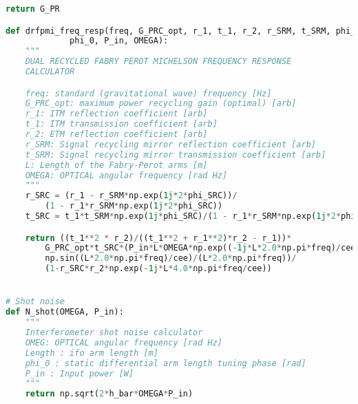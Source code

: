 \begin{lstlisting}[frame=single, language=Python]
    return G_PR

def drfpmi_freq_resp(freq, G_PRC_opt, r_1, t_1, r_2, r_SRM, t_SRM, phi_SRC, L, 
		     phi_0, P_in, OMEGA):
    """
    DUAL RECYCLED FABRY PEROT MICHELSON FREQUENCY RESPONSE 
    CALCULATOR

    freq: standard (gravitational wave) frequency [Hz]
    G_PRC_opt: maximum power recycling gain (optimal) [arb]
    r_1: ITM reflection coefficient [arb]
    t_1: ITM transmission coefficient [arb]
    r_2: ETM reflection coefficient [arb]
    r_SRM: Signal recycling mirror reflection coefficient [arb]
    t_SRM: Signal recycling mirror transmission coefficient [arb]
    L: Length of the Fabry-Perot arms [m]
    OMEGA: OPTICAL angular frequency [rad Hz]
    """
    r_SRC = (r_1 - r_SRM*np.exp(1j*2*phi_SRC))/
	    (1 - r_1*r_SRM*np.exp(1j*2*phi_SRC))
    t_SRC = t_1*t_SRM*np.exp(1j*phi_SRC)/(1 - r_1*r_SRM*np.exp(1j*2*phi_SRC))

    return ((t_1**2 * r_2)/((t_1**2 + r_1**2)*r_2 - r_1))*
	    G_PRC_opt*t_SRC*(P_in*L*OMEGA*np.exp((-1j*L*2.0*np.pi*freq)/cee)*
	    np.sin((L*2.0*np.pi*freq)/cee)/(L*2.0*np.pi*freq))/
	    (1-r_SRC*r_2*np.exp(-1j*L*4.0*np.pi*freq/cee))


# Shot noise
def N_shot(OMEGA, P_in):
    """
    Interferometer shot noise calculator
    OMEG: OPTICAL angular frequency [rad Hz]
    Length : ifo arm length [m]
    phi_0 : static differential arm length tuning phase [rad]
    P_in : Input power [W]
    """
    return np.sqrt(2*h_bar*OMEGA*P_in)
\end{lstlisting}

